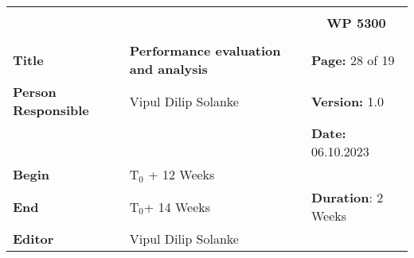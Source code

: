 \begin{table}[!h]
  \begin{center}
    \begin{tabular}{|p{35mm}||p{55mm}|p{50mm}||p{40mm}|}
      \hline
      \multicolumn{3}{|l||}{\textbf{}} & \multicolumn{1}{c|}{}                                                                                                                                                \\
      \multicolumn{3}{|l||}{\textbf{}} & \multicolumn{1}{c|}{\textbf{WP 5300}}                                                                                                                                \\
      \multicolumn{3}{|l||}{\textbf{}} & \multicolumn{1}{c|}{}                                                                                                                                                \\
      \hline\hline
      \textbf{Title}                   & \multicolumn{2}{p{7cm}||}{\textbf{Performance evaluation and analysis}}
                                       & \textbf{Page:} 28 of 19                                                                                                                                            \\
      \hline
      \textbf{Person Responsible}        & \multicolumn{2}{l||}{Vipul Dilip Solanke}                                                                                                   & \textbf{Version:} 1.0   \\
      \hline
      \multicolumn{3}{|l||}{}          & \textbf{Date:} 06.10.2023                                                                                                                                          \\
      \hline\hline
      \textbf{Begin}                  & \multicolumn{2}{l||}{T$_0$ + 12 Weeks}                                                                                                                &                         \\
      \hline
      \textbf{End}                    & \multicolumn{2}{l||}{T$_0$+ 14 Weeks}                                                                                                        & \textbf{Duration}: 2 Weeks \\
      \hline\hline
      \textbf{Editor}              & \multicolumn{3}{l|}{Vipul Dilip Solanke}                                                                                                                              \\

\end{tabular}
\end{center}
\end{table}
